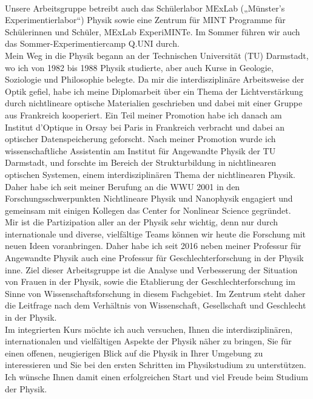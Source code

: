 \begin{multicols}{2}
\begin{footnotesize}
\\[1.5ex]
Unsere Arbeitsgruppe betreibt auch das Schülerlabor MExLab („Münster’s Experimentierlabor“) Physik sowie eine Zentrum für MINT Programme für Schülerinnen und Schüler, MExLab ExperiMINTe. Im Sommer führen wir auch das Sommer-Experimentiercamp Q.UNI durch.
\\[1.5ex]
Mein Weg in die Physik begann an der Technischen Universität (TU) Darmstadt, wo ich von 1982 bis 1988 Physik studierte, aber auch Kurse in Geologie, Soziologie und Philosophie belegte. Da mir die interdisziplinäre Arbeitsweise der Optik gefiel, habe ich meine Diplomarbeit über ein Thema der Lichtverstärkung durch nichtlineare optische Materialien geschrieben und dabei mit einer Gruppe aus Frankreich kooperiert. Ein Teil meiner Promotion habe ich danach am Institut d’Optique in Orsay bei Paris in Frankreich verbracht und dabei an optischer Datenspeicherung geforscht. Nach meiner Promotion wurde ich wissenschaftliche Assistentin am Institut für Angewandte Physik der TU Darmstadt, und forschte im Bereich der Strukturbildung in nichtlinearen optischen Systemen, einem interdisziplinären Thema der nichtlinearen Physik. Daher habe ich seit meiner Berufung an die WWU 2001 in den Forschungsschwerpunkten Nichtlineare Physik und Nanophysik engagiert und gemeinsam mit einigen Kollegen das Center for Nonlinear Science gegründet.
\\[1.5ex]
Mir ist die Partizipation aller an der Physik sehr wichtig, denn nur durch internationale und diverse, vielfältige Teams können wir heute die Forschung mit neuen Ideen voranbringen. Daher habe ich seit 2016 neben meiner Professur für Angewandte Physik auch eine Professur für Geschlechterforschung in der Physik inne. Ziel dieser Arbeitsgruppe ist die Analyse und Verbesserung der Situation von Frauen in der Physik, sowie die Etablierung der Geschlechterforschung im Sinne von Wissenschaftsforschung in diesem Fachgebiet. Im Zentrum steht daher die Leitfrage nach dem Verhältnis von Wissenschaft, Gesellschaft und Geschlecht in der Physik.
\\[1.5ex]
Im integrierten Kurs möchte ich auch versuchen, Ihnen die interdisziplinären, internationalen und vielfältigen Aspekte der Physik näher zu bringen, Sie für einen offenen, neugierigen Blick auf die Physik in Ihrer Umgebung zu interessieren und Sie bei den ersten Schritten im Physikstudium zu unterstützen.
\\[1.5ex]
Ich wünsche Ihnen damit einen erfolgreichen Start und viel Freude beim Studium der Physik.

\end{footnotesize}
\end{multicols}

